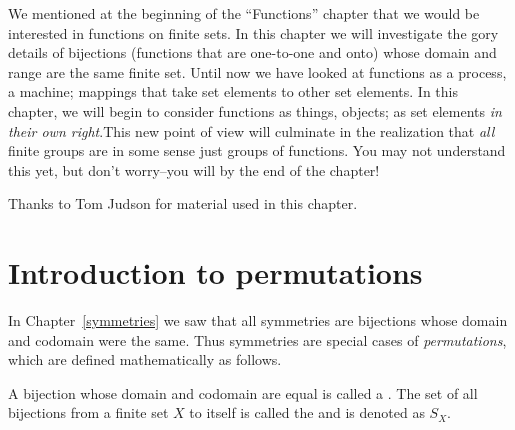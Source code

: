 We mentioned at the beginning of  the ``Functions'' chapter that we would be interested in functions on finite sets. In this chapter we will investigate the gory details of bijections (functions that are one-to-one and onto) whose domain and range are the same finite set. Until now we have looked at functions as a process, a machine; mappings that take set elements to other set elements. In this chapter, we will begin to consider functions as things, objects; as set elements \emph{in their own right}.This new point of view will culminate in the realization that \emph{all} finite groups are in some sense just groups of functions. You may not understand this yet, but don't worry--you will by the end of the chapter!
\bigskip


Thanks to Tom Judson for material used in this chapter.

\section{Introduction to permutations}
\label{sec:Permutation:Introduction}

In Chapter~\ref{symmetries} we saw that all symmetries are  bijections whose domain and codomain were the same.  Thus symmetries are special cases of \emph{permutations}, which are defined mathematically as follows.

\begin{defn} \label{defperm}
A bijection whose domain and codomain are equal is called a . The set of all bijections from a finite set $X$ to itself is called the  and is denoted as $S_X$.
\end{defn}

